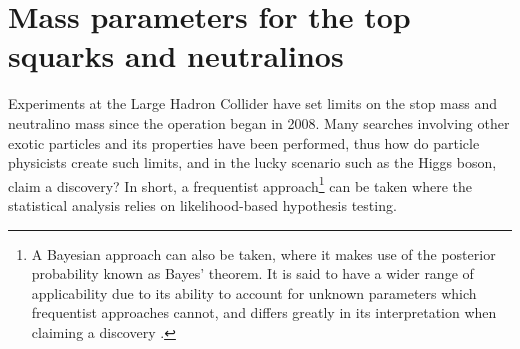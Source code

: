 
\section{Mass parameters for the top squarks and neutralinos}
Experiments at the Large Hadron Collider have set limits on the stop mass and neutralino mass since the operation began in 2008. Many searches involving other exotic particles and its properties have been performed, thus how do particle physicists create such limits, and in the lucky scenario such as the Higgs boson, claim a discovery? In short, a frequentist approach\footnote{A Bayesian approach can also be taken, where it makes use of the posterior probability known as Bayes' theorem. It is said to have a wider range of applicability due to its ability to account for unknown parameters which frequentist approaches cannot, and differs greatly in its interpretation when claiming a discovery \cite{lista2017statistical}.} can be taken where the statistical analysis relies on likelihood-based hypothesis testing.

